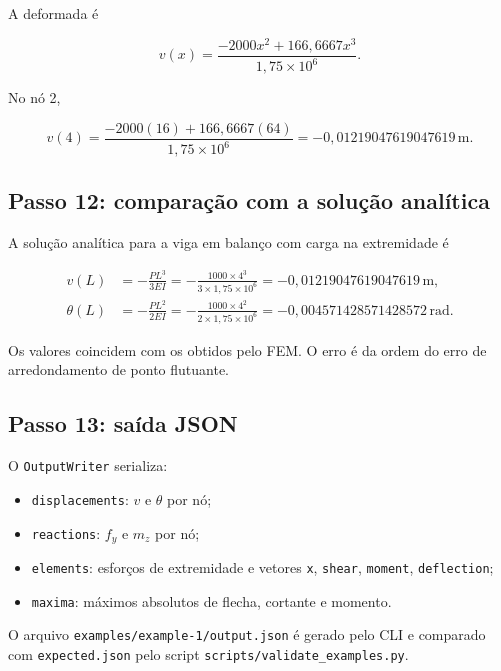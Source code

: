 \documentclass[12pt,a4paper]{article}
\newcommand{\unit}[1]{\,\mathrm{#1}}
\begin{document}
A deformada é

\begin{equation}
  v(x) = \frac{-2000x^2 + 166{,}6667x^3}{1{,}75\times10^6}.
  \label{eq:ex_vx}
\end{equation}

No nó 2,

\begin{equation}
  v(4) = \frac{-2000(16)+166{,}6667(64)}{1{,}75\times10^6}
       = -0{,}01219047619047619\unit{m}.
  \label{eq:ex_v4}
\end{equation}

\subsection{Passo 12: comparação com a solução analítica}

A solução analítica para a viga em balanço com carga na extremidade é

\begin{align}
  v(L) &= -\frac{PL^3}{3EI}
        = -\frac{1000\times4^3}{3\times1{,}75\times10^6}
        = -0{,}01219047619047619\unit{m}, \label{eq:ex_analitico_v}\\
  \theta(L) &= -\frac{PL^2}{2EI}
        = -\frac{1000\times4^2}{2\times1{,}75\times10^6}
        = -0{,}004571428571428572\unit{rad}. \label{eq:ex_analitico_theta}
\end{align}

Os valores coincidem com os obtidos pelo FEM. O erro é da ordem do erro de arredondamento de ponto flutuante.

\subsection{Passo 13: saída JSON}

O \texttt{OutputWriter} serializa:

\begin{itemize}[leftmargin=1.5em]
  \item \texttt{displacements}: \(v\) e \(\theta\) por nó;
  \item \texttt{reactions}: \(f_y\) e \(m_z\) por nó;
  \item \texttt{elements}: esforços de extremidade e vetores \texttt{x}, \texttt{shear}, \texttt{moment}, \texttt{deflection};
  \item \texttt{maxima}: máximos absolutos de flecha, cortante e momento.
\end{itemize}

O arquivo \texttt{examples/example-1/output.json} é gerado pelo CLI e comparado com \texttt{expected.json} pelo script \texttt{scripts/validate\_examples.py}.
\end{document}
